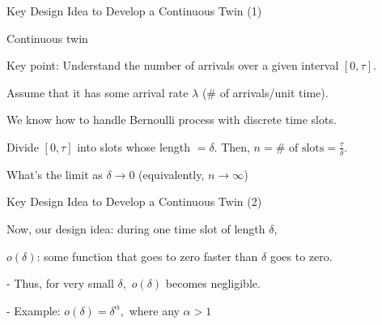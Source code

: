 \documentclass[fleqn,aspectratio=169]{beamer}
\begin{document}
\begin{frame}{Key Design Idea to Develop a Continuous Twin (1)}

\plitemsep 0.1in
\bci
\item<1-> Continuous twin

\bci
\item<2-> Key point: Understand the number of arrivals over a given interval $[0,\tau].$

\item<3-> Assume that it has some arrival rate $\lambda$ (\# of arrivals/unit time).

\item<4-> We know how to handle Bernoulli process with discrete time slots. 
\eci


\item<5-> Divide $[0,\tau]$ into slots whose length $=\delta.$ Then, $n= \# \text{ of slots} = \frac{\tau}{\delta}.$ 
\begin{center}
\end{center}

\item<6-> What's the limit as $\delta \rightarrow 0$ (equivalently, $n \rightarrow \infty$)

\eci
\end{frame}

\begin{frame}{Key Design Idea to Develop a Continuous Twin (2)}

\begin{center}
\end{center}
\vspace{-0.8cm}
\plitemsep 0.1in
\bci
\item<1-> Now, our design idea: during one time slot of length $\delta$, 
{
}
{
}
\item<9-> $o(\delta)$: some function that goes to zero faster than $\delta$ goes to zero. 

- Thus, for very small $\delta,$ $o(\delta)$ becomes negligible. 

- Example: $o(\delta)= \delta^\alpha,$ where any $\alpha >1$



\eci
\end{frame}
\end{document}
